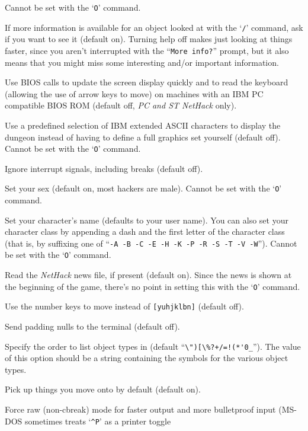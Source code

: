 Cannot be set with the `{\tt O}' command.
\item[\ib{help}]
If more information is available for an object looked at
with the `{\tt /}' command, ask if you want to see it (default on). Turning help
off makes just looking at things faster, since you aren't interrupted with the
``{\tt More info?}'' prompt, but it also means that you might miss some
interesting and/or important information.
\item[\ib{IBM\_BIOS}]
Use BIOS calls to update the screen display quickly and to read the keyboard
(allowing the use of arrow keys to move) on machines with an IBM PC
compatible BIOS ROM (default off, {\it PC\/ {\rm and} ST NetHack\/} only).
\item[\ib{IBMgraphics}]
Use a predefined selection of IBM extended ASCII characters to display the
dungeon instead of having to define a full graphics set yourself (default off).
Cannot be set with the `{\tt O}' command.
\item[\ib{ignintr}]
Ignore interrupt signals, including breaks (default off).
\item[\ib{male}]
Set your sex (default on, most hackers are male).
Cannot be set with the `{\tt O}' command.
\item[\ib{name}]
Set your character's name (defaults to your user name).  You can also
set your character class by appending a dash and the first letter of
the character class (that is, by suffixing one of
``{\tt -A -B -C -E -H -K -P -R -S -T -V -W}'').
Cannot be set with the `{\tt O}' command.
\item[\ib{news}]
Read the {\it NetHack\/} news file, if present (default on).
Since the news is shown at the beginning of the game, there's no point
in setting this with the `{\tt O}' command.
\item[\ib{number\_pad}]
Use the number keys to move instead of {\tt [yuhjklbn]} (default off).
\item[\ib{null}]
Send padding nulls to the terminal (default off).
\item[\ib{packorder}]
Specify the order to list object types in (default
``\verb&\")[\%?+/=!(*'0_&''). The value of this option should be a string
containing the symbols for the various object types.
\item[\ib{pickup}]
Pick up things you move onto by default (default on).
\item[\ib{rawio}]
Force raw (non-cbreak) mode for faster output and more
bulletproof input (MS-DOS sometimes treats `{\tt \^{}P}' as a printer toggle
